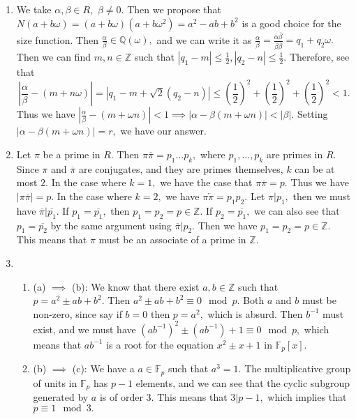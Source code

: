 \documentclass[]{article}
\begin{document}
\begin{enumerate}
	\item We take $\alpha, \beta \in R,$ $\beta \neq 0.$ Then we propose that $N(a+b\omega)=(a+b\omega)(a+b \omega^2)=a^2-ab+b^2$ is a good choice for the size function. Then $\frac{\alpha}{\beta} \in \mathbb{Q}(\omega),$ and we can write it as $ \frac{\alpha}{\beta}=\frac{\alpha \overline{\beta}}{\beta \overline{\beta}}=q_1+q_2\omega.$ Then we can find $m ,n \in \mathbb{Z}$ such that $|q_1-m| \leq \frac{1}{2}, |q_2-n| \leq \frac{1}{2}.$ Therefore, see that 
	$$|\frac{\alpha}{\beta}-(m+n\omega)|= |q_1-m +\sqrt{2}(q_2-n)|\leq \left( \frac{1}{2} \right)^2 + \left( \frac{1}{2} \right)^2  +\left( \frac{1}{2} \right)^2 < 1.$$ Thus we have $\left| \frac{\alpha}{\beta} - (m+\omega n) \right|<1 \implies \left| \alpha - \beta (m+\omega n) \right| < |\beta|. $ Setting $\left| \alpha - \beta (m+\omega n) \right|=r,$ we have our answer.
	\item Let $\pi$ be a prime in $R.$ Then $\pi \overline{\pi}=p_1\dots p_k,$ where $p_1,\dots, p_k$ are primes in $R.$ Since $\pi$ and $\overline{\pi}$ are conjugates, and they are primes themselves, $k$ can be at most $2.$ In the case where $k=1,$ we have the case that $\pi \overline{\pi}=p.$ Thus we have $|\pi \overline{\pi}|=p.$ In the case where $k=2,$ we have $\pi \overleftarrow{\pi}=p_1p_2.$ Let $\pi | p_1, $ then we must have $ \overline{\pi} | \overline{p_1}$. If $p_1= \overline{p_1},$ then $p_1=p_2=p \in \mathbb{Z}.$ If $p_2= \overline{p_1},$ we can also see that $p_1=\overline{p_2}$ by the same argument using $\overline{\pi}|p_2.$ Then we have $p_1=p_2=p \in \mathbb{Z}.$ This means that $\pi$ must be an associate of a prime in $\mathbb{Z}.$
	\item \begin{enumerate}
		\item (a) $\implies$ (b): We know that there exist $a,b \in \mathbb{Z}$ such that $p=a^2 \pm ab +b^2.$ Then $a^2\pm ab +b^2 \equiv 0 \mod p.$ Both $a$ and $b$ must be non-zero, since say if $b=0$ then $p=a^2,$ which is absurd. Then $b^{-1}$ must exist, and we must have $(ab^{-1})^2\pm (ab^{-1})+1 \equiv 0 \mod p,$ which means that $ab^{-1}$ is a root for the equation $x^2 \pm x +1$ in $\mathbb{F}_p[x].$
		
		\item (b) $\implies$ (c): We have a $a \in \mathbb{F}_p$ such that $a^3=1.$ The multiplicative group of units in $\mathbb{F}_p$ has $p-1$ elements, and we can see that the cyclic subgroup generated by $a$ is of order $3.$ This means that $3 | p-1,$ which implies that $p\equiv 1 \mod 3.$
		

\end{enumerate}
\end{enumerate}
\end{document}
